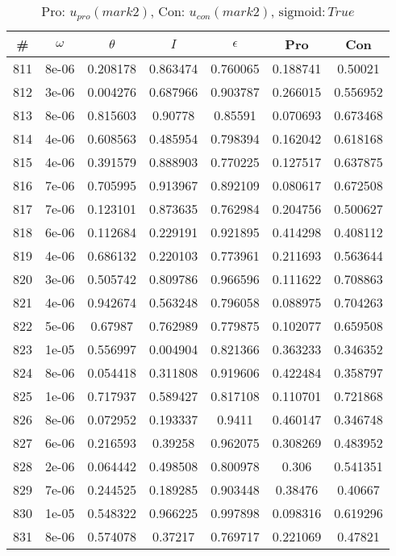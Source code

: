 \newpage
\begin{table}
\caption{Pro: $u_{pro} (mark 2)$, Con: $u_{con} (mark 2)$, $\mathrm{sigmoid}: True$}
\begin{tabular*}{\linewidth}{c|c|c|c|c|c|c}
\# & $\omega$ & $\theta$ & $I$ & $\epsilon$ & Pro & Con \\
\hline
811 & 8e-06 & 0.208178 & 0.863474 & 0.760065 & 0.188741 & 0.50021\\
812 & 3e-06 & 0.004276 & 0.687966 & 0.903787 & 0.266015 & 0.556952\\
813 & 8e-06 & 0.815603 & 0.90778 & 0.85591 & 0.070693 & 0.673468\\
814 & 4e-06 & 0.608563 & 0.485954 & 0.798394 & 0.162042 & 0.618168\\
815 & 4e-06 & 0.391579 & 0.888903 & 0.770225 & 0.127517 & 0.637875\\
816 & 7e-06 & 0.705995 & 0.913967 & 0.892109 & 0.080617 & 0.672508\\
817 & 7e-06 & 0.123101 & 0.873635 & 0.762984 & 0.204756 & 0.500627\\
818 & 6e-06 & 0.112684 & 0.229191 & 0.921895 & 0.414298 & 0.408112\\
819 & 4e-06 & 0.686132 & 0.220103 & 0.773961 & 0.211693 & 0.563644\\
820 & 3e-06 & 0.505742 & 0.809786 & 0.966596 & 0.111622 & 0.708863\\
821 & 4e-06 & 0.942674 & 0.563248 & 0.796058 & 0.088975 & 0.704263\\
822 & 5e-06 & 0.67987 & 0.762989 & 0.779875 & 0.102077 & 0.659508\\
823 & 1e-05 & 0.556997 & 0.004904 & 0.821366 & 0.363233 & 0.346352\\
824 & 8e-06 & 0.054418 & 0.311808 & 0.919606 & 0.422484 & 0.358797\\
825 & 1e-06 & 0.717937 & 0.589427 & 0.817108 & 0.110701 & 0.721868\\
826 & 8e-06 & 0.072952 & 0.193337 & 0.9411 & 0.460147 & 0.346748\\
827 & 6e-06 & 0.216593 & 0.39258 & 0.962075 & 0.308269 & 0.483952\\
828 & 2e-06 & 0.064442 & 0.498508 & 0.800978 & 0.306 & 0.541351\\
829 & 7e-06 & 0.244525 & 0.189285 & 0.903448 & 0.38476 & 0.40667\\
830 & 1e-05 & 0.548322 & 0.966225 & 0.997898 & 0.098316 & 0.619296\\
831 & 8e-06 & 0.574078 & 0.37217 & 0.769717 & 0.221069 & 0.47821\\

\end{tabular*}
\end{table}
